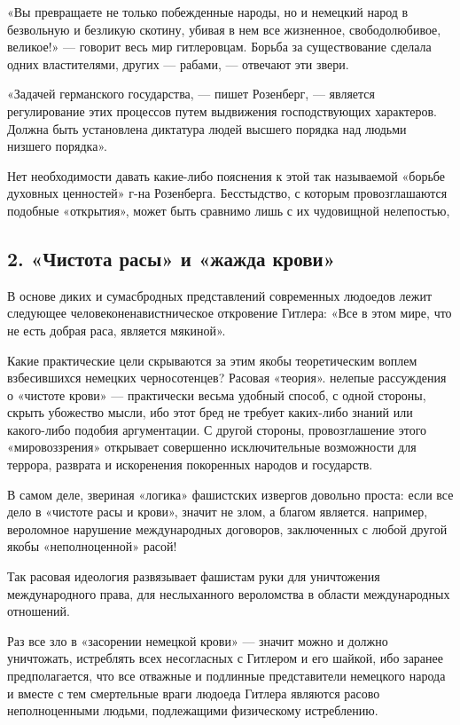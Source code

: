 \documentclass[12pt, a4paper, openany]{book}
\begin{document}
«Вы превращаете не только побежденные народы, но и немецкий народ в безвольную и безликую скотину, убивая в нем все жизненное, свободолюбивое, великое!» — говорит весь мир гитлеровцам. Борьба за существование сделала одних властителями, других — рабами, — отвечают эти звери.

«Задачей германского государства, — пишет Розенберг, — является регулирование этих процессов путем выдвижения господствующих характеров. Должна быть установлена диктатура людей высшего порядка над людьми низшего порядка».

Нет необходимости давать какие-либо пояснения к этой так называемой «борьбе духовных ценностей» г-на Розенберга. Бесстыдство, с которым провозглашаются подобные «открытия», может быть сравнимо лишь с их чудовищной нелепостью,
	
	\subsection*{\center \textbf{2. «Чистота расы» и «жажда крови»}}


В основе диких и сумасбродных представлений современных людоедов лежит следующее человеконенавистническое откровение Гитлера: «Все в этом мире, что не есть добрая раса, является мякиной».
	
Какие практические цели скрываются за этим якобы теоретическим воплем взбесившихся немецких черносотенцев? Расовая «теория». нелепые рассуждения о «чистоте крови» — практически весьма удобный способ, с одной стороны, скрыть убожество мысли, ибо этот бред не требует каких-либо знаний или какого-либо подобия аргументации. С другой стороны, провозглашение этого «мировоззрения» открывает совершенно исключительные возможности для террора, разврата и искоренения покоренных народов и государств.

В самом деле, звериная «логика» фашистских извергов довольно проста: если все дело в «чистоте расы и крови», значит не злом, а благом является. например, вероломное нарушение международных договоров, заключенных с любой другой якобы «неполноценной» расой!

Так расовая идеология развязывает фашистам руки для уничтожения международного права, для неслыханного вероломства в области международных отношений.

Раз все зло в «засорении немецкой крови» — значит можно и должно уничтожать, истреблять всех несогласных с Гитлером и его шайкой, ибо заранее предполагается, что все отважные и подлинные представители немецкого народа и вместе с тем смертельные враги людоеда Гитлера являются расово неполноценными людьми, подлежащими физическому истреблению.
\end{document}
